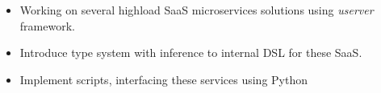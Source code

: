 \documentclass[10pt,a4paper,ragged2e,withhyper]{altacv}
\begin{document}


\begin{paracol}{2}

\tagline{}


\makecvheader

\medskip


\begin{itemize}
    \item Working on several highload SaaS microservices solutions using \textit{userver} framework.
    \item Introduce type system with inference to internal DSL for these SaaS.
    \item Implement scripts, interfacing these services using Python
\end{itemize}




\end{paracol}
\end{document}
